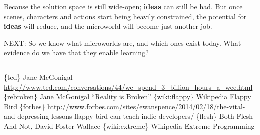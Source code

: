 Because the solution space is still wide-open; \textbf{ideas} can still
be had. But once scenes, characters and actions start being heavily
constrained, the potential for \textbf{ideas} will reduce, and the
microworld will become just another job.

NEXT: So we know what microworlds are, and which ones exist today. What
evidence do we have that they enable learning?

\begin{center}\rule{3in}{0.4pt}\end{center}

\{ted\} Jane McGonigal
\href{http://www.ted.com/conversations/44/we\_spend\_3\_billion\_hours\_a\_wee.html}{http://www.ted.com/conversations/44/we\_spend\_3\_billion\_hours\_a\_wee.html}
\{rebroken\} Jane McGonigal ``Reality is Broken'' \{wiki:flappy\}
Wikipedia Flappy Bird \{forbes\}
http://www.forbes.com/sites/ewanspence/2014/02/18/the-vital-and-depressing-lessons-flappy-bird-can-teach-indie-developers/
\{flesh\} Both Flesh And Not, David Foster Wallace \{wiki:extreme\}
Wikipedia Extreme Programming
